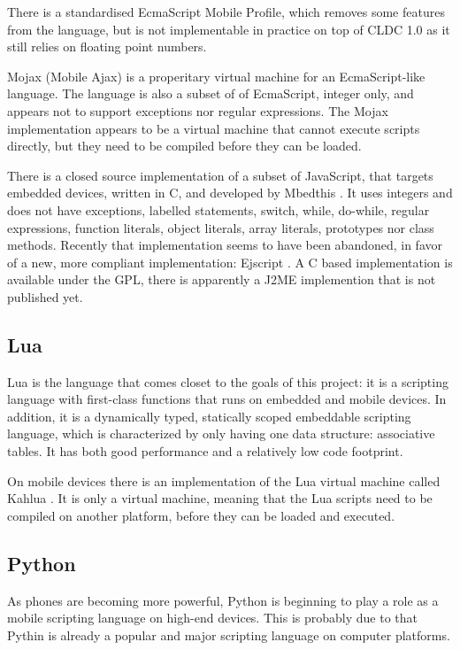 \documentclass[11pt]{report}
\begin{document}
There is a standardised EcmaScript Mobile Profile, which removes some features from the language, but is not implementable in practice on top of CLDC 1.0 as it still relies on floating point numbers.

Mojax (Mobile Ajax) \cite{mojax} is a properitary virtual machine for an EcmaScript-like language. The language is also a subset of of EcmaScript, integer only, and appears not to support exceptions nor regular expressions.
The Mojax implementation appears to be a virtual machine that cannot execute scripts directly, but they need to be compiled before they can be loaded.

There is a closed source implementation of a subset of JavaScript, that targets embedded devices, written in C, and developed by Mbedthis \cite{mbedthis}. It uses integers and does not have exceptions, labelled statements, switch, while, do-while, regular expressions, function literals, object literals, array literals, prototypes nor class methods.
Recently that implementation seems to have been abandoned, in favor of a new, more compliant implementation: Ejscript \cite{ejscript}.
A C based implementation is available under the GPL, there is apparently a J2ME implemention that is not published yet.

\subsection{Lua}
Lua is the language that comes closet to the goals of this project: it is a scripting language with first-class functions that runs on embedded and mobile devices.
In addition, it is a dynamically typed, statically scoped embeddable scripting language, which is characterized by only having one data structure: associative tables.
It has both good performance and a relatively low code footprint.

On mobile devices there is an implementation of the Lua virtual machine called Kahlua \cite{kahlua}.
It is only a virtual machine, meaning that the Lua scripts need to be compiled on another platform, before they can be loaded and executed.

\subsection{Python}
As phones are becoming more powerful, Python is beginning to play a role as a mobile scripting language on high-end devices. This is probably due to that Pythin is already a popular and major scripting language on computer platforms.
\end{document}

